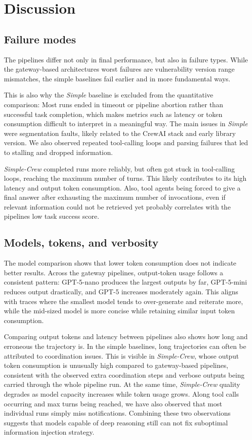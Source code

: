 \section{Discussion}

\subsection{Failure modes}
The pipelines differ not only in final performance, but also in failure types.
While the gateway-based architectures worst failures are vulnerability version range mismatches, the simple baselines fail earlier and in more fundamental ways.

This is also why the \emph{Simple} baseline is excluded from the quantitative comparison:
Most runs ended in timeout or pipeline abortion rather than successful task completion, which makes metrics such as latency or token consumption difficult to interpret in a meaningful way.
The main issues in \emph{Simple} were segmentation faults, likely related to the CrewAI stack and early library version.
We also observed repeated tool-calling loops and parsing failures that led to stalling and dropped information.

\emph{Simple-Crew} completed runs more reliably, but often got stuck in tool-calling loops, reaching the maximum number of turns.
This likely contributes to its high latency and output token consumption.
Also, tool agents being forced to give a final answer after exhausting the maximum number of invocations, even if relevant information could not be retrieved yet probably correlates with the pipelines low task success score.

\subsection{Models, tokens, and verbosity}
The model comparison shows that lower token consumption does not indicate better results.
Across the gateway pipelines, output-token usage follows a consistent pattern:
GPT-5-nano produces the largest outputs by far, GPT-5-mini reduces output drastically, and GPT-5 increases moderately again.
This aligns with traces where the smallest model tends to over-generate and reiterate more, while the mid-sized model is more concise while retaining similar input token consumption.

Comparing output tokens and latency between pipelines also shows how long and erroneous the trajectory is.
In the simple baselines, long trajectories can often be attributed to coordination issues.
This is visible in \emph{Simple-Crew}, whose output token consumption is unusually high compared to gateway-based pipelines, consistent with the observed extra coordination steps and verbose outputs being carried through the whole pipeline run.
At the same time, \emph{Simple-Crew} quality degrades as model capacity increases while token usage grows.
Along tool calls occurring and max turns being reached, we have also observed that most individual runs simply miss notifications.
Combining these two observations suggests that models capable of deep reasoning still can not fix suboptimal information injection strategy.

